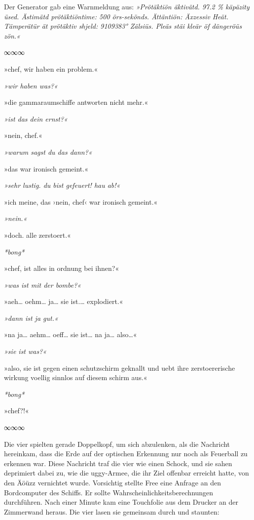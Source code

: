 Der Generator gab eine Warnmeldung aus: \textit{»Prötäktiön äktivätd. 97.2 \% käpäzity üsed. Ästimätd prötäktiöntime: 500 örs-sekönds. Ättäntiön: Äxzessiv Heät. Tämperätür ät prötäktiv shjeld: 9109383° Zälsiüs. Pleäs stäi kleär öf dängeröüs zön.«}

\begin{center}
    ∞∞∞
\end{center}

»chef, wir haben ein problem.«

\textit{»wir haben was?«}

»die gammaraumschiffe antworten nicht mehr.«

\textit{»ist das dein ernst?«}

»nein, chef.«

\textit{»warum sagst du das dann?«}

»das war ironisch gemeint.«

\textit{»sehr lustig. du bist gefeuert! hau ab!«}

»ich meine, das ›nein, chef‹ war ironisch gemeint.«

\textit{»nein.«}

»doch. alle zerstoert.«

\textit{*bong*}

»chef, ist alles in ordnung bei ihnen?«

\textit{»was ist mit der bombe?«}

»aeh… oehm… ja… sie ist.… explodiert.«

\textit{»dann ist ja gut.«}

»na ja… aehm… oeff… sie ist… na ja… also…«

\textit{»sie ist was?«}

»also, sie ist gegen einen schutzschirm geknallt und uebt ihre zerstoererische wirkung voellig sinnlos auf diesem schirm aus.«

\textit{*bong*}

»chef?!«

\begin{center}
    ∞∞∞
\end{center}

Die vier spielten gerade Doppelkopf, um sich abzulenken, als die Nachricht hereinkam, dass die Erde auf der optischen Erkennung nur noch als Feuerball zu erkennen war. Diese Nachricht traf die vier wie einen Schock, und sie sahen deprimiert dabei zu, wie die uggy-Armee, die ihr Ziel offenbar erreicht hatte, von den Äöüzz vernichtet wurde. Vorsichtig stellte Free eine Anfrage an den Bordcomputer des Schiffs. Er sollte Wahrscheinlichkeitsberechnungen durchführen. Nach einer Minute kam eine Touchfolie aus dem Drucker an der Zimmerwand heraus. Die vier lasen sie gemeinsam durch und staunten:

